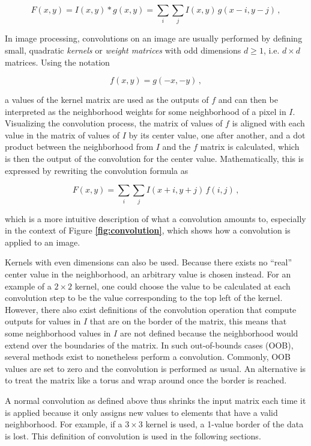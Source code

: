 \[ F(x, y) = I(x, y) * g(x, y) = \sum \limits_i \sum \limits_j I(x, y) \, g(x - i, y - j) \,, \] 

In image processing, convolutions on an image are usually performed by defining small, quadratic \textit{kernels} or \textit{weight matrices} with odd dimensions $d \geq 1$, i.e.  $d \times d$ matrices. Using the notation

\[ f(x, y) = g(-x, -y) \,, \]

a values of the kernel matrix are used as the outputs of $f$ and can then be interpreted as the neighborhood weights for some neighborhood of a pixel in $I$. Visualizing the convolution process, the matrix of values of $f$ is aligned with each value in the matrix of values of $I$ by its center value, one after another, and a dot product between the neighborhood from $I$ and the $f$ matrix is calculated, which is then the output of the convolution for the center value. Mathematically, this is expressed by rewriting the convolution formula as

\[ F(x, y) = \sum \limits_i \sum \limits_j I(x + i, y + j) \, f(i, j) \,, \]

which is a more intuitive description of what a convolution amounts to, especially in the context of Figure \textbf{\ref{fig:convolution}}, which shows how a convolution is applied to an image. 

Kernels with even dimensions can also be used. Because there exists no ``real'' center value in the neighborhood, an arbitrary value is chosen instead. For an example of a $2 \times 2$ kernel, one could choose the value to be calculated at each convolution step to be the value corresponding to the top left of the kernel. \cite[pp. 32-33]{machine_vision}\\

However, there also exist definitions of the convolution operation that compute outputs for values in $I$ that are on the border of the matrix, this means that some neighborhood values in $I$ are not defined because the neighborhood would extend over the boundaries of the matrix. In such out-of-bounds cases (OOB), several methods exist to nonetheless perform a convolution. Commonly, OOB values are set to zero and the convolution is performed as usual. An alternative is to treat the matrix like a torus and wrap around once the border is reached.

A normal convolution as defined above thus shrinks the input matrix each time it is applied because it only assigns new values to elements that have a valid neighborhood. For example, if a $3 \times 3$ kernel is used, a 1-value border of the data is lost. This definition of convolution is used in the following sections.\\

